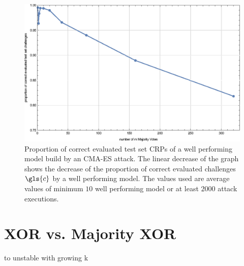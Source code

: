 \begin{figure}[ht]
\includegraphics[width=1.00\textwidth]{images/single-mv-classification-cma-attack-correctness.eps}
\caption[Proportion of correct evaluated test set challenges of a model approximated by the \acs{CMA-ES} attack]{Proportion of correct evaluated test set \acp{CRP} of a well performing model build by an \ac{CMA-ES} attack. The linear decrease of the graph shows the decrease of the proportion of correct evaluated challenges $\gls{c}$ by a well performing model. The values used are average values of minimum $10$ well performing model or at least $2000$ attack executions.}
\label{fig:cmasingleattackcorrectness}
\end{figure}


\section{\acs{XOR} \apufs vs. Majority \acs{XOR} \apufs}



\xpuf to unstable with growing k





